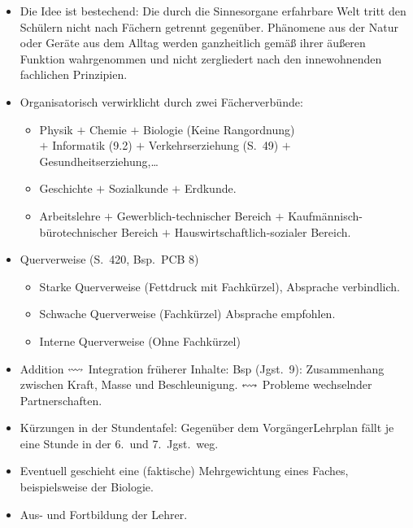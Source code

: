 \begin{itemize}
	\item Die Idee ist bestechend: Die durch die Sinnesorgane
	erfahrbare Welt tritt den Sch\"{u}lern nicht nach F\"{a}chern
	getrennt gegen\"{u}ber.
	Ph\"{a}nomene aus der Natur oder Ger\"{a}te aus dem Alltag
	werden ganzheitlich gem\"{a}{\ss} ihrer \"{a}u{\ss}eren Funktion wahrgenommen
	und nicht zergliedert nach den innewohnenden fachlichen Prinzipien.
	
	\item
	Organisatorisch verwirklicht durch zwei F\"{a}cherverb\"{u}nde:
	\begin{itemize}
	\item
	Physik $+$ Chemie $+$ Biologie (Keine Rangordnung) \\
	$+$ Informatik (9.2) $+$ Verkehrserziehung (S.\ 49)
	$+$ Gesundheitserziehung,\dots
	
	\item
	Geschichte $+$ Sozialkunde $+$ Erdkunde.
	
	\item
	Arbeitslehre $+$ Gewerblich-technischer Bereich $+$
	Kaufm\"{a}nnisch-b\"{u}rotechnischer Bereich $+$
	Hauswirtschaftlich-sozialer Bereich.
	\end{itemize}
	
	\item
	Querverweise (S.\ 420, Bsp.\ PCB 8)
	\begin{itemize}
		\item
		Starke Querverweise (Fettdruck mit Fachk\"{u}rzel),
		Absprache verbindlich.
		\item
		Schwache Querverweise (Fachk\"{u}rzel) Absprache empfohlen.
		\item
		Interne Querverweise (Ohne Fachk\"{u}rzel)
	\end{itemize}
	
	\item
	Addition $\leftrightsquigarrow$ Integration fr\"{u}herer Inhalte:
	Bsp (Jgst.\ 9): Zusammenhang zwischen Kraft,
	Masse und Beschleunigung.
	$\leftrightsquigarrow$ Probleme wechselnder Partnerschaften.
	
	\item K\"{u}rzungen in der Stundentafel:
	Gegen\"{u}ber dem Vorg\"{a}ngerLehrplan f\"{a}llt je eine Stunde
	in der 6.\ und 7.\ Jgst.\ weg.
	
	\item
	Eventuell geschieht eine (faktische) Mehrgewichtung eines
	Faches, beispielsweise der Biologie.
	\item
	Aus- und Fortbildung der Lehrer.
	

\end{itemize}

